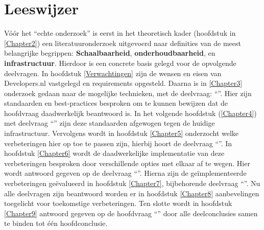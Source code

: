 \section{Leeswijzer}

Vóór het \enquote{echte onderzoek} is eerst in het theoretisch kader (hoofdstuk in \ref{Chapter2}) een literatuuronderzoek uitgevoerd naar definities van de meest belangrijke begrippen: \textbf{Schaalbaarheid}, \textbf{onderhoudbaarheid}, en \textbf{infrastructuur}. Hierdoor is een concrete basis gelegd voor de opvolgende deelvragen. In hoofdstuk \ref{Verwachtingen} zijn de wensen en eisen van Developers.nl vastgelegd en requirements opgesteld. Daarna is in \ref{Chapter3} onderzoek gedaan naar de mogelijke technieken, met de deelvraag: \enquote{\deeltechnieken}. Hier zijn standaarden en best-practices besproken om te kunnen bewijzen dat de hoofdvraag daadwerkelijk beantwoord is. In het volgende hoofdstuk (\ref{Chapter4}) met deelvraag \enquote{\deelhuidig} zijn deze standaarden afgewogen tegen de huidige infrastructuur. Vervolgens wordt in hoofdstuk \ref{Chapter5} onderzocht welke verbeteringen hier op toe te passen zijn, hierbij hoort de deelvraag \enquote{\deelverbetering}. In hoofdstuk \ref{Chapter6} wordt de daadwerkelijke implementatie van deze verbeteringen besproken door verschillende opties met elkaar af te wegen. Hier wordt antwoord gegeven op de deelvraag \enquote{\deelverbetering}. Hierna zijn de geïmplementeerde verbeteringen geëvalueerd in hoofdstuk \ref{Chapter7}, bijbehorende deelvraag \enquote{\deelrequirements}. Nu alle deelvragen zijn beantwoord worden er in hoofdstuk \ref{Chapter8} aanbevelingen toegelicht voor toekomstige verbeteringen. Ten slotte wordt in hoofdstuk \ref{Chapter9} antwoord gegeven op de hoofdvraag \enquote{\hoofdvraagname} door alle deelconclusies samen te binden tot één hoofdconclusie.
